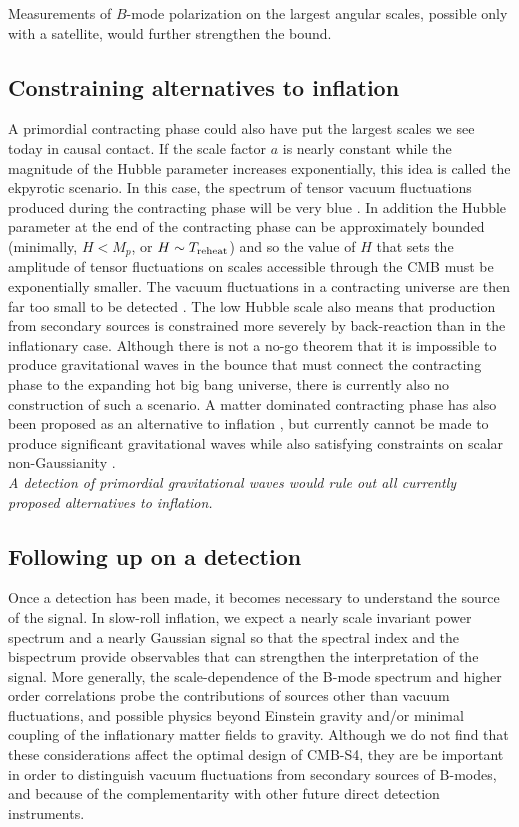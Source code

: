 Measurements of $B$-mode polarization on the largest angular scales, possible only with a satellite, would further strengthen the bound. 

\subsection{Constraining alternatives to inflation}
A primordial contracting phase could also have put the largest scales we see today in causal contact. If the scale factor $a$ is nearly constant while the magnitude of the Hubble parameter increases exponentially, this idea is called the ekpyrotic scenario. In this case, the spectrum of tensor vacuum fluctuations produced during the contracting phase will be very blue \cite{Khoury:2001wf}. In addition the Hubble parameter at the end of the contracting phase can be approximately bounded (minimally, $H<M_p$, or $H\sim T_{\rm reheat}$) and so the value of $H$ that sets the amplitude of tensor fluctuations on scales accessible through the CMB must be exponentially smaller. The vacuum fluctuations in a contracting universe are then far too small to be detected \cite{Boyle:2003km}. The low Hubble scale also means that production from secondary sources is constrained more severely by back-reaction than in the inflationary case. Although there is not a no-go theorem that it is impossible to produce gravitational waves in the bounce that must connect the contracting phase to the expanding hot big bang universe, there is currently also no construction of such a scenario. A matter dominated contracting phase has also been proposed as an alternative to inflation \cite{Brandenberger:2012zb,Cai:2014jla,deHaro:2015wda}, but currently cannot be made to produce significant gravitational waves while also satisfying constraints on scalar non-Gaussianity \cite{Quintin:2015rta}. \\

{\it A detection of primordial gravitational waves would rule out all currently proposed alternatives to inflation.}

\subsection{Following up on a detection}
\label{sec:beyond_r}

Once a detection has been made, it becomes necessary to understand the source of the signal. In slow-roll inflation, we expect a nearly scale invariant power spectrum and a nearly Gaussian signal so that the spectral index and the bispectrum provide observables that can strengthen the interpretation of the signal. More generally, the scale-dependence of the B-mode spectrum and higher order correlations probe the contributions of sources other than vacuum fluctuations, and possible physics beyond Einstein gravity and/or minimal coupling of the inflationary matter fields to gravity. Although we do not find that these considerations affect the optimal design of CMB-S4, they are be important in order to distinguish vacuum fluctuations from secondary sources of B-modes, and because of the complementarity with other future direct detection instruments.

